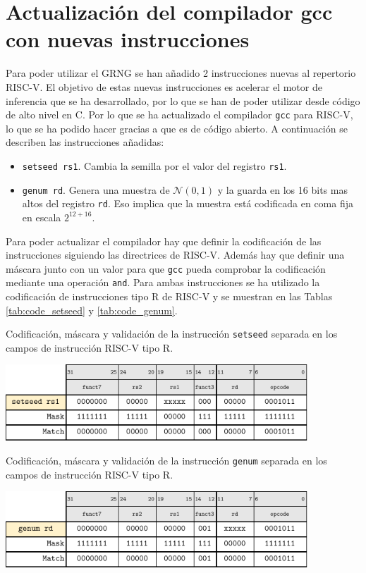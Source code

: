 \section{Actualización del compilador gcc con nuevas instrucciones}

Para poder utilizar el GRNG se han añadido 2 instrucciones nuevas al repertorio RISC-V. El objetivo de estas nuevas instrucciones es acelerar el motor de inferencia que se ha desarrollado, por lo que se han de poder utilizar desde código de alto nivel en C. Por lo que se ha actualizado el compilador \texttt{gcc} para RISC-V, lo que se ha podido hacer gracias a que es de código abierto. A continuación se describen las instrucciones añadidas:
\begin{itemize}
    \item \texttt{setseed rs1}. Cambia la semilla por el valor del registro \texttt{rs1}.
    \item \texttt{genum rd}. Genera una muestra de $\mathcal{N}(0,1)$ y la guarda en los 16 bits mas altos del registro \texttt{rd}. Eso implica que la muestra está codificada en coma fija en escala $2^{12 + 16}$.
\end{itemize}

Para poder actualizar el compilador hay que definir la codificación de las instrucciones siguiendo las directrices de RISC-V. Además hay que definir una máscara junto con un valor para que \texttt{gcc} pueda comprobar la codificación mediante una operación \texttt{and}. Para ambas instrucciones se ha utilizado la codificación de instrucciones tipo R de RISC-V y se muestran en las Tablas \ref{tab:code_setseed} y \ref{tab:code_genum}.

\begin{table}[h]
    \centering
    \caption{Codificación, máscara y validación de la instrucción \texttt{setseed} separada en los campos de instrucción RISC-V tipo R.}
    \label{tab:code_setseed}
    \includegraphics[width=0.85\textwidth]{root/Imagenes/riscv_ext/code_setseed.pdf}
\end{table}

\begin{table}[h]
    \centering
    \caption{Codificación, máscara y validación de la instrucción \texttt{genum} separada en los campos de instrucción RISC-V tipo R.}
    \label{tab:code_genum}
    \includegraphics[width=0.85\textwidth]{root/Imagenes/riscv_ext/code_genum.pdf}
\end{table}

